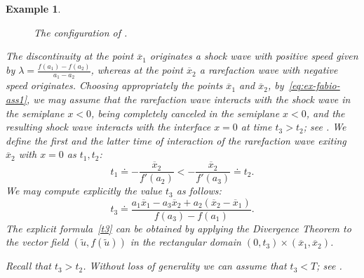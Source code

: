 \documentclass[a4paper, 10pt, final]{article}
\newtheorem{example}{Example}[section]
\begin{document}
\begin{example}
\begin{figure}
\begin{tikzpicture}[line cap=round,line join=round,x=1.cm,y=1.cm]
    \end{tikzpicture}
    \caption{The configuration of .}
    \label{fig:ex-fabio-flux}
  \end{figure}
  
 
  The discontinuity at the point $\overline x_1$ originates a shock wave with positive
  speed given by $\lambda = \frac{f(a_1) - f(a_2)}{a_1 - a_2}$, 
  whereas at the point $\overline x_2$ a rarefaction wave with negative speed originates.
  Choosing appropriately the points $\overline x_1$ and $\overline x_2$, by~\eqref{eq:ex-fabio-ass1}, 
  we may assume that  the rarefaction wave interacts
  with the shock wave in the semiplane $x<0$, being 
  completely canceled in the semiplane $x<0$,  and the resulting shock wave interacts with the interface $x=0$
  at time $t_3>t_2$; see .  We define the first and the latter time of interaction of the rarefaction wave
  exiting $\overline{x}_2$ with $x=0$ as $t_1,t_2$: 
  \begin{equation}
    \label{eq:times_ex_2}
        t_1  \doteq  - \frac{\overline{x}_2}{f'(a_2)}<   - \frac{\overline{x}_2}{f'(a_3)}\doteq t_2.   
  \end{equation}
  We may compute explicitly the value $t_3$ as follows: 
  \begin{equation} 
    \label{t3}
    t_3  \doteq   \frac{a_1 \overline{x}_1 - a_3 
    \overline{x}_2 + a_2(\overline{x}_2 - \overline{x}_1)}{f(a_3) - f(a_1)}.
  \end{equation}
  The   explicit formula~\eqref{t3} can be obtained by  applying the Divergence Theorem to the vector field $(\widetilde u, f(\widetilde u))$ in  the  rectangular  domain 
 $(0, t_3) \times (\overline{x}_1, \overline{x}_2)$. 

  Recall that $t_3>t_2$. Without loss of generality we can assume that $t_3< T$; 
  see . 
  \begin{figure}
    \centering
\end{figure}
\end{example}
\end{document}
